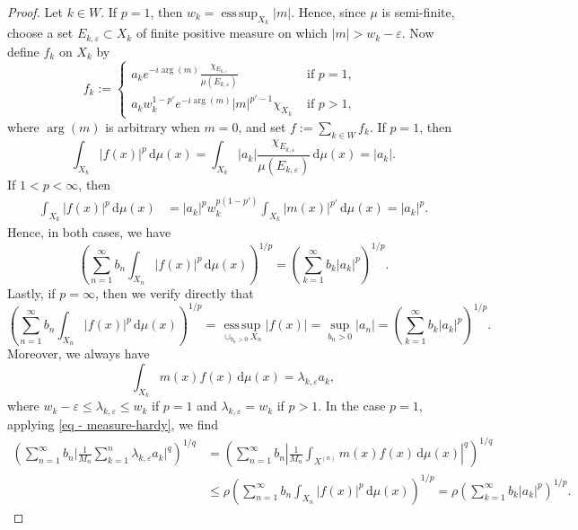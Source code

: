 \documentclass[oneside,10pt]{article}          %
\numberwithin{equation}{section}
\begin{document}
\begin{proof}
Let $k \in W$. If $p=1$, then $w_k=\operatorname*{ess\,sup}_{X_k}|m|$. Hence, since $\mu$ is semi-finite, choose a set $E_{k,\varepsilon}\subset X_k$ of finite positive measure on which $|m|>w_k-\varepsilon$. Now define $f_{k}$ on $X_k$ by
\[
f_{k} := \begin{cases} 
    a_k e^{-i \arg(m)} \frac{\chi_{E_{k,\varepsilon}} }{\mu(E_{k,\varepsilon})} & \text{ if } p = 1, \\
    a_k w_k^{1-p'}e^{-i \arg(m)}|m|^{p'-1} \chi_{X_k} & \text{ if } p > 1,    
    \end{cases}
\qquad 
\]
where $\arg(m)$ is arbitrary when $m=0$, and set $f := \sum_{k \in W} f_{k}$. If $p=1$, then
\[
\int_{X_k}|f(x)|^p\,\mathrm{d}\mu(x) = \int_{X_k}|a_k|\frac{\chi_{E_{k,\varepsilon}}}{\mu(E_{k,\varepsilon})}\,\mathrm{d}\mu(x) = |a_k|.
\]
If $1<p<\infty$, then
\[
\begin{aligned}
    \int_{X_k}|f(x)|^p\,\mathrm{d}\mu(x)
    &= |a_k|^p w_k^{p(1-p')} \int_{X_k}|m(x)|^{p'}\,\mathrm{d}\mu(x) %
    = |a_k|^p .
\end{aligned}
\]
Hence, in both cases, we have
\[
\left(\sum_{n=1}^{\infty} b_n \int_{X_n}|f(x)|^p\,\mathrm{d}\mu(x) \right)^{\!\!1/p} = \left(
\sum_{k=1}^{\infty} b_k |a_k|^p \right)^{\!\!1/p}.
\]
Lastly, if $p=\infty$, then we verify directly that
\[
\left(\sum_{n=1}^{\infty} b_n \int_{X_n}|f(x)|^p\,\mathrm{d}\mu(x) \right)^{\!\!1/p} =\operatorname*{ess\,sup}_{\cup_{b_n> 0} X_n}|f(x)| = \sup_{b_n> 0}|a_n|
= \left(\sum_{k=1}^{\infty} b_k |a_k|^p \right)^{\!\!1/p}.
\]
Moreover, we always have
\[
\int_{X_k}m(x)f(x)\,\mathrm{d}\mu(x) = \lambda_{k,\varepsilon}a_k,
\]
where $w_k-\varepsilon \leq \lambda_{k,\varepsilon} \leq w_k$ if $p=1$ and $\lambda_{k,\varepsilon}=w_k$ if $p>1$. In the case $p = 1$, applying \eqref{eq - measure-hardy}, we find 
\begin{align*}
    \left( \sum_{n=1}^{\infty} b_n \bigg| \frac1{M_n} \sum_{k=1}^{n} \lambda_{k,\varepsilon}a_k \bigg|^q \right)^{\!\!1/q}\!\! &= \left(\sum_{n=1}^{\infty} b_n \left| \frac{1}{M_n} \int_{X^{(n)}}m(x)f(x)\,\mathrm{d}\mu(x) \right|^q\right)^{\!\!1/q} \\
    &\leq \rho \!\left(\sum_{n=1}^{\infty} b_n \int_{X_n}|f(x)|^p\,\mathrm{d}\mu(x) \right)^{\!\!1/p} \!\!= \rho\!\left(\sum_{k=1}^{\infty} b_k |a_k|^p \right)^{\!\!1/p}\!.
\end{align*}

\end{proof}
\end{document}
